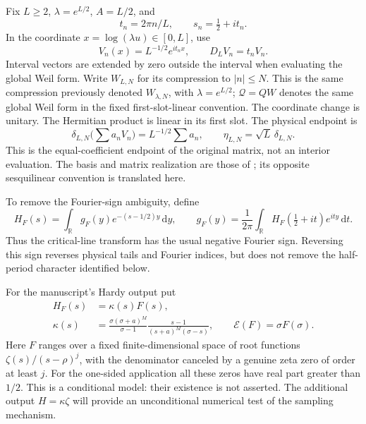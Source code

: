 \documentclass[11pt]{article}
\theoremstyle{remark}
\newcommand{\Q}{\mathcal Q}
\newcommand{\E}{\mathscr E}
\newcommand{\dd}{\mathrm d}
\begin{document}
Fix $L\ge2$, $\lambda=e^{L/2}$, $A=L/2$, and
\[
 t_n=2\pi n/L,\qquad s_n=\tfrac12+it_n.
\]
In the coordinate $x=\log(\lambda u)\in[0,L]$, use
\[
 V_n(x)=L^{-1/2}e^{it_nx},\qquad D_LV_n=t_nV_n.
\]
Interval vectors are extended by zero outside the interval when evaluating the
global Weil form. Write $W_{L,N}$ for its compression to $|n|\le N$.
This is the same compression previously denoted $W_{\lambda,N}$, with $\lambda=e^{L/2}$; $\Q=QW$ denotes the same global Weil form in the fixed first-slot-linear convention. The coordinate change is unitary. The Hermitian product is linear in its first slot. The physical endpoint is
\begin{equation}\label{v1:eq:delta}
 \delta_{L,N}\Big(\sum a_nV_n\Big)=L^{-1/2}\sum a_n,
 \qquad \eta_{L,N}=\sqrt L\,\delta_{L,N}.
\end{equation}
This is the equal-coefficient endpoint of the original matrix, not an
interior evaluation. The basis and matrix realization are those of
\cite{ConnesConsaniMoscovici2025}; its opposite sesquilinear convention is translated here.

To remove the Fourier-sign ambiguity, define
\begin{equation}\label{v1:eq:transform}
 H_F(s)=\int_{\mathbb R}g_F(y)e^{-(s-1/2)y}\,\dd y,
 \qquad
 g_F(y)=\frac1{2\pi}\int_{\mathbb R}H_F(\tfrac12+it)e^{ity}\,\dd t.
\end{equation}
Thus the critical-line transform has the usual negative Fourier sign.
Reversing this sign reverses physical tails and Fourier indices, but does
not remove the half-period character identified below.

For the manuscript's Hardy output put
\begin{equation}\label{v1:eq:hardy}
 \begin{split}
 H_F(s)&=\kappa(s)F(s),\\
 \kappa(s)&=\frac{\sigma(\sigma+a)^M}{\sigma-1}
       \frac{s-1}{(s+a)^M(\sigma-s)},
 \qquad \E(F)=\sigma F(\sigma).
 \end{split}
\end{equation}
Here $F$ ranges over a fixed finite-dimensional space of root functions
$\zeta(s)/(s-\rho)^j$, with the denominator canceled by a genuine zeta
zero of order at least $j$. For the one-sided application all these zeros
have real part greater than $1/2$. This is a conditional model: their
existence is not asserted. The additional output $H=\kappa\zeta$ will
provide an unconditional numerical test of the sampling mechanism.
\end{document}
